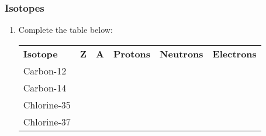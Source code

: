             \subsubsection{  Isotopes }
            \nopagebreak
        \label{m38753*id258699}\begin{enumerate}[noitemsep, label=\textbf{\arabic*}. ] 
            \label{m38753*uid69}\item Complete the table below:
          \begin{table}[H]
        \begin{center}
      \label{m38753*id258715}
    \noindent
      \tablelasttail{}
      \begin{xtabular}[t]{|l|l|l|l|l|l|}\hline
        \textbf{Isotope} &
        \textbf{Z} &
        \textbf{A} &
        \textbf{Protons} &
        \textbf{Neutrons} &
        \textbf{Electrons}%
     \tabularnewline{}
        Carbon-12 &
         &
         &
         &
         &
     \tabularnewline{}
        Carbon-14 &
         &
         &
         &
         &
     \tabularnewline{}
        Chlorine-35 &
         &
         &
         &
         &
     \tabularnewline{}
        Chlorine-37 &
         &
         &
         &
         &
     \tabularnewline{}
    \end{xtabular}
      \end{center}

\end{table}
\end{enumerate}
